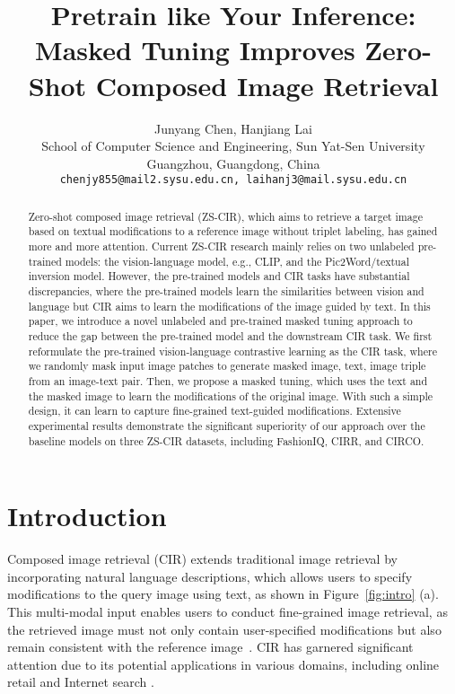 \documentclass[10pt,twocolumn,letterpaper]{article}
\title{Pretrain like Your Inference: Masked Tuning Improves Zero-Shot Composed Image Retrieval}
\author{Junyang Chen, Hanjiang Lai\\
School of Computer Science and Engineering, Sun Yat-Sen University\\
Guangzhou, Guangdong, China\\
{\tt\small chenjy855@mail2.sysu.edu.cn, laihanj3@mail.sysu.edu.cn}
}
\begin{document}
\maketitle

\begin{abstract}
    Zero-shot composed image retrieval (ZS-CIR), which aims to retrieve a target image based on textual modifications to a reference image without triplet labeling, has gained more and more attention. Current ZS-CIR research mainly relies on two unlabeled pre-trained models:  the vision-language model, e.g., CLIP, and the Pic2Word/textual inversion model. However, the pre-trained models and CIR tasks have substantial discrepancies, where the pre-trained models learn the similarities between vision and language but CIR aims to learn the modifications of the image guided by text. In this paper, we introduce a novel unlabeled and pre-trained masked tuning approach to reduce the gap between the pre-trained model and the downstream CIR task. We first reformulate the pre-trained vision-language contrastive learning as the CIR task, where we randomly mask input image patches to generate masked image, text, image triple from an image-text pair. Then, we propose a masked tuning, which uses the text and the masked image to learn the modifications of the original image. With such a simple design, it can learn to capture fine-grained text-guided modifications. Extensive experimental results demonstrate the significant superiority of our approach over the baseline models on three ZS-CIR datasets, including FashionIQ, CIRR, and CIRCO.
\end{abstract}

\section{Introduction}

Composed image retrieval (CIR) \cite{baldrati2022effective, liu2021image, lee2021cosmo} extends traditional image retrieval by incorporating natural language descriptions, which allows users to specify modifications to the query image using text, as shown in Figure~\ref{fig:intro} (a). This multi-modal input enables users to conduct fine-grained image retrieval, as the retrieved image must not only contain user-specified modifications but also remain consistent with the reference image~\cite{vo2019composing}. CIR has garnered significant attention due to its potential applications in various domains, including online retail and Internet search \cite{jandial2022sac, wu2021fashion}.
\end{document}
